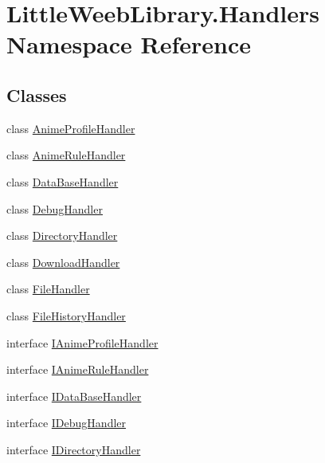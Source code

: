 \hypertarget{namespace_little_weeb_library_1_1_handlers}{}\section{Little\+Weeb\+Library.\+Handlers Namespace Reference}
\label{namespace_little_weeb_library_1_1_handlers}
\subsection*{Classes}
\begin{DoxyCompactItemize}
\item 
class \mbox{\hyperlink{class_little_weeb_library_1_1_handlers_1_1_anime_profile_handler}{Anime\+Profile\+Handler}}
\item 
class \mbox{\hyperlink{class_little_weeb_library_1_1_handlers_1_1_anime_rule_handler}{Anime\+Rule\+Handler}}
\item 
class \mbox{\hyperlink{class_little_weeb_library_1_1_handlers_1_1_data_base_handler}{Data\+Base\+Handler}}
\item 
class \mbox{\hyperlink{class_little_weeb_library_1_1_handlers_1_1_debug_handler}{Debug\+Handler}}
\item 
class \mbox{\hyperlink{class_little_weeb_library_1_1_handlers_1_1_directory_handler}{Directory\+Handler}}
\item 
class \mbox{\hyperlink{class_little_weeb_library_1_1_handlers_1_1_download_handler}{Download\+Handler}}
\item 
class \mbox{\hyperlink{class_little_weeb_library_1_1_handlers_1_1_file_handler}{File\+Handler}}
\item 
class \mbox{\hyperlink{class_little_weeb_library_1_1_handlers_1_1_file_history_handler}{File\+History\+Handler}}
\item 
interface \mbox{\hyperlink{interface_little_weeb_library_1_1_handlers_1_1_i_anime_profile_handler}{I\+Anime\+Profile\+Handler}}
\item 
interface \mbox{\hyperlink{interface_little_weeb_library_1_1_handlers_1_1_i_anime_rule_handler}{I\+Anime\+Rule\+Handler}}
\item 
interface \mbox{\hyperlink{interface_little_weeb_library_1_1_handlers_1_1_i_data_base_handler}{I\+Data\+Base\+Handler}}
\item 
interface \mbox{\hyperlink{interface_little_weeb_library_1_1_handlers_1_1_i_debug_handler}{I\+Debug\+Handler}}
\item 
interface \mbox{\hyperlink{interface_little_weeb_library_1_1_handlers_1_1_i_directory_handler}{I\+Directory\+Handler}}

\end{DoxyCompactItemize}
